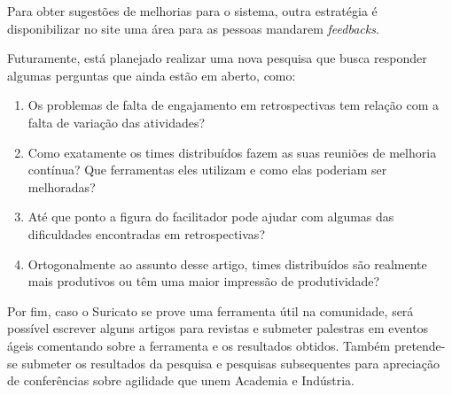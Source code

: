 Para obter sugestões de melhorias para o sistema, outra estratégia é disponibilizar no site uma área para as pessoas mandarem \textit{feedbacks}.

Futuramente, está planejado realizar uma nova pesquisa que busca responder algumas perguntas que ainda estão em aberto, como:

\begin{enumerate}
	\item Os problemas de falta de engajamento em retrospectivas tem relação com a falta de variação das atividades?
	\item Como exatamente os times distribuídos fazem as suas reuniões de melhoria contínua? Que ferramentas eles utilizam e como elas poderiam ser melhoradas?
	\item Até que ponto a figura do facilitador pode ajudar com algumas das dificuldades encontradas em retrospectivas?
	\item Ortogonalmente ao assunto desse artigo, times distribuídos são realmente mais produtivos ou têm uma maior impressão de produtividade?
\end{enumerate}

Por fim, caso o Suricato se prove uma ferramenta útil na comunidade, será possível escrever alguns artigos para revistas e submeter palestras em eventos ágeis comentando sobre a ferramenta e os resultados obtidos. Também pretende-se submeter os resultados da pesquisa e pesquisas subsequentes para apreciação de conferências sobre agilidade que unem Academia e Indústria.